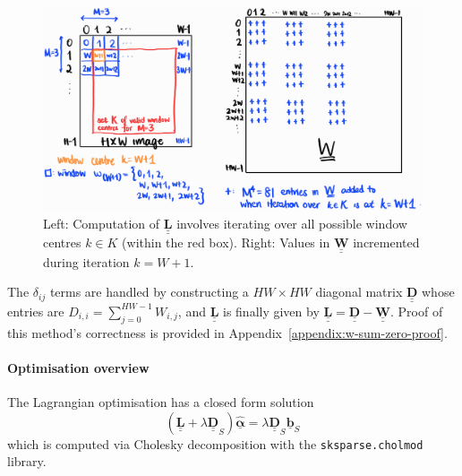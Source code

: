 \documentclass{article}
\theoremstyle{definition}
\def\vt#1{\underline{\mathbf{#1}}}
\def\vts#1{\underline{\boldsymbol{#1}}}
\def\mt#1{\underline{\underline{\mathbf{#1}}}}
\def\mts#1{\underline{\underline{\boldsymbol{#1}}}}
\begin{document}
\begin{multicols}{2}[]



\begin{figure}[H]
    \centering
    \includegraphics[width=\linewidth]{index-displacement}
    \caption{Left: Computation of $\mt L$ involves iterating over all possible window centres $k\in K$ (within the red box). Right: Values in $\mt W$ incremented during iteration $k=W+1$.}
    \label{fig:index-displacement}
\end{figure}
The $\delta_{ij}$ terms are handled by constructing a $HW\times HW$ diagonal matrix $\mt D$ whose entries are $D_{i,i} = \sum_{j=0}^{HW-1} W_{i,j}$, and $\mt L$ is finally given by $\mt L = \mt D - \mt W$. Proof of this method's correctness is provided in Appendix~\ref{appendix:w-sum-zero-proof}.

\paragraph{Optimisation overview}
The Lagrangian optimisation has a closed form solution
$$(\mt L + \lambda \mt D_S) \hat{\vts \alpha} = \lambda \mt D_S \vt b_S$$
which is computed via Cholesky decomposition with the \verb|sksparse.cholmod| library.


\end{multicols}
\end{document}
